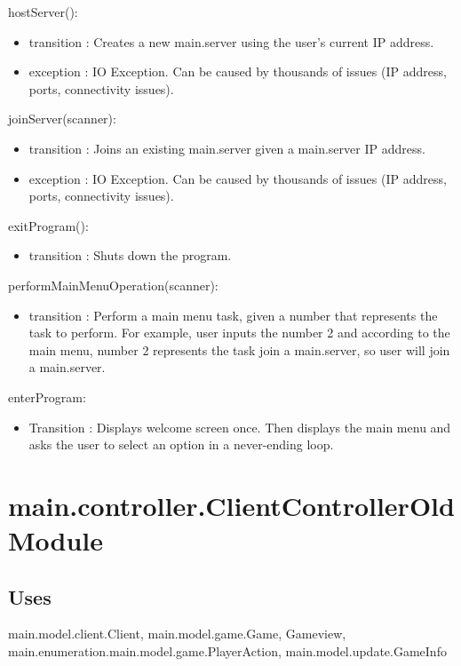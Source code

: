 \documentclass[12pt, titlepage]{article}
\begin{document}
        \noindent hostServer():
        \begin{itemize}
        \item transition : Creates a new main.server using the user's current IP address.
        \item exception : IO Exception. Can be caused by thousands of issues (IP address, ports, connectivity issues).
        \end{itemize}
        
        \noindent joinServer(scanner):
        \begin{itemize}
        \item transition : Joins an existing main.server given a main.server IP address.
        \item exception : IO Exception. Can be caused by thousands of issues (IP address, ports, connectivity issues).
        \end{itemize}

        \noindent exitProgram():
        \begin{itemize}
        \item transition : Shuts down the program.
        \end{itemize}
        
        \noindent performMainMenuOperation(scanner):
        \begin{itemize}
        \item transition : Perform a main menu task, given a number that represents the task to perform. For example, user inputs the number 2 and according to the main menu, number 2 represents the task join a main.server, so user will join a main.server.
        \end{itemize}
        
        \noindent enterProgram:
        \begin{itemize}
        \item Transition : Displays welcome screen once. Then displays the main menu and asks the user to select an option in a never-ending loop.
        \end{itemize}
        
        
\section* {main.controller.ClientControllerOld Module}
    \subsection* {Uses}
        main.model.client.Client, main.model.game.Game, Gameview, main.enumeration.main.model.game.PlayerAction, main.model.update.GameInfo
\end{document}
